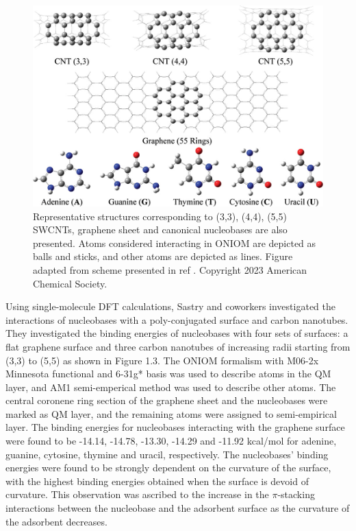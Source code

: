 \begin{figure}
    \centering
    \includegraphics{Introduction/Figures/Figure3.png}
    \caption[Representative structures corresponding to (3,3), (4,4), (5,5) SWCNTs, graphene sheet and canonical nucleobases]{Representative structures corresponding to (3,3), (4,4), (5,5) SWCNTs, graphene sheet and canonical nucleobases are also presented. Atoms considered interacting in ONIOM are depicted as balls and sticks, and other atoms are depicted as lines. Figure adapted from scheme presented in ref \supercite{umadevi_quantum_2011}. Copyright 2023 American Chemical Society.}
    \label{fig:figure3}
\end{figure}

Using single-molecule DFT calculations, Sastry and coworkers investigated the interactions of nucleobases with a poly-conjugated surface and carbon nanotubes.\supercite{umadevi_quantum_2011} They investigated the binding energies of nucleobases with four sets of surfaces: a flat graphene surface and three carbon nanotubes of increasing radii starting from (3,3) to (5,5) as shown in Figure 1.3. The ONIOM formalism with M06-2x Minnesota functional and 6-31g* basis was used to describe atoms in the QM layer, and AM1 semi-emperical method was used to describe other atoms. The central coronene ring section of the graphene sheet and the nucleobases were marked as QM layer, and the remaining atoms were assigned to semi-empirical layer. The binding energies for nucleobases interacting with the graphene surface were found to be -14.14, -14.78, -13.30, -14.29 and -11.92 kcal/mol for adenine, guanine, cytosine, thymine and uracil, respectively. The nucleobases' binding energies were found to be strongly dependent on the curvature of the surface, with the highest binding energies obtained when the surface is devoid of curvature. This observation was ascribed to the increase in the $\pi$-stacking interactions between the nucleobase and the adsorbent surface as the curvature of the adsorbent decreases.

